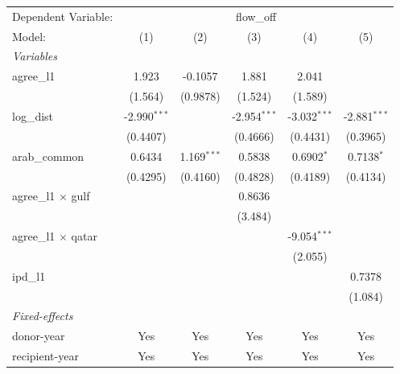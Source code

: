 
\begingroup
\centering
\begin{tabular}{lccccc}
   \tabularnewline \midrule \midrule
   Dependent Variable: & \multicolumn{5}{c}{flow\_off}\\
   Model:                     & (1)            & (2)           & (3)            & (4)            & (5)\\  
   \midrule
   \emph{Variables}\\
   agree\_l1                  & 1.923          & -0.1057       & 1.881          & 2.041          &   \\   
                              & (1.564)        & (0.9878)      & (1.524)        & (1.589)        &   \\   
   log\_dist                  & -2.990$^{***}$ &               & -2.954$^{***}$ & -3.032$^{***}$ & -2.881$^{***}$\\   
                              & (0.4407)       &               & (0.4666)       & (0.4431)       & (0.3965)\\   
   arab\_common               & 0.6434         & 1.169$^{***}$ & 0.5838         & 0.6902$^{*}$   & 0.7138$^{*}$\\   
                              & (0.4295)       & (0.4160)      & (0.4828)       & (0.4189)       & (0.4134)\\   
   agree\_l1 $\times$ gulf    &                &               & 0.8636         &                &   \\   
                              &                &               & (3.484)        &                &   \\   
   agree\_l1 $\times$ qatar   &                &               &                & -9.054$^{***}$ &   \\   
                              &                &               &                & (2.055)        &   \\   
   ipd\_l1                    &                &               &                &                & 0.7378\\   
                              &                &               &                &                & (1.084)\\   
   \midrule
   \emph{Fixed-effects}\\
   donor-year                 & Yes            & Yes           & Yes            & Yes            & Yes\\  
   recipient-year             & Yes            & Yes           & Yes            & Yes            & Yes\\  

\end{tabular}
